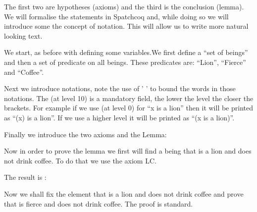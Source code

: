 The first two are hypotheses (axioms) and the third is the conclusion (lemma). We will formalise the statements in Spatchcoq and, while doing so we will introduce some the concept of notation. This will allow us to write more natural looking text.

We start, as before with defining some variables.We first define a ``set of beings'' and then a set of predicate on all beings. These predicates are: ``Lion'', ``Fierce'' and ``Coffee''. 




Next we introduce notations, note the use of ' ' to bound the words in those notations. The (at level 10) is a mandatory field, the lower the level the closer the brackets. For example if we use (at level 0) for ``x is a lion'' then it will be printed as ``(x) is a lion''. If we use a higher level it will be printed as ``(x is a lion)''.




Finally we introduce the two axioms and the Lemma:


Now in order to prove the lemma we first will find a being that is a lion and does not drink coffee. To do that we use the axiom LC.



The result is :


Now we shall fix the element that is a lion and does not drink coffee and prove that is fierce and does not drink coffee. The proof is standard.



